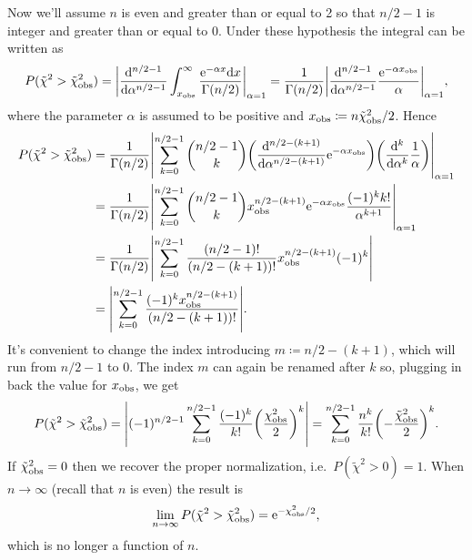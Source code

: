 Now we'll assume $n$ is even and greater than or equal to \num{2} so that $n/2-1$ is integer and greater than or equal to \num{0}.
Under these hypothesis the integral can be written as
\begin{equation*}
	P(\tilde\chi^2>\tilde\chi^2_\textup{obs})  =
	\abs*{\deriv[n/2-1]{}{\alpha}\int_{x_\textup{obs}}^\infty\frac{\eu^{-\alpha x} \!\ud x}{\Gamma(n/2)}}_{\alpha=1}
	= \frac{1}{\Gamma(n/2)}\abs*{\deriv[n/2-1]{}{\alpha}\frac{\eu^{-\alpha x_\textup{obs}}}{\alpha}}_{\alpha=1},
\end{equation*}
where the parameter $\alpha$ is assumed to be positive and $x_\textup{obs} \coloneqq n\tilde \chi^2_\textup{obs}/2$.
Hence
\begin{equation*}
	\begin{aligned}
		P(\tilde\chi^2>\tilde\chi^2_\textup{obs})
		&= \frac{1}{\Gamma(n/2)}
		\abs*{\sum_{k=0}^{n/2-1}{n/2-1 \choose k}
			\roundBrackets*{\deriv[n/2-(k+1)]{}{\alpha}\eu^{-\alpha x_\textup{obs}}}
			\roundBrackets*{\deriv[k]{}{\alpha}\frac{1}{\alpha}}
		}_{\alpha=1}\\
		&= \frac{1}{\Gamma(n/2)}
		\abs*{\sum_{k=0}^{n/2-1}{n/2-1 \choose k}
			x_\textup{obs}^{n/2-(k+1)}\eu^{-\alpha x_\textup{obs}}
			\frac{(-1)^kk!}{\alpha^{k+1}}
		}_{\alpha=1}\\
		&= \frac{1}{\Gamma(n/2)}
		\abs*{\sum_{k=0}^{n/2-1}\frac{(n/2-1)!}{ (n/2 - (k+1))!}
			x_\textup{obs}^{n/2-(k+1)}
			(-1)^k
		}\\
		&=
		\abs*{
			\sum_{k=0}^{n/2-1}\frac{(-1)^kx_\textup{obs}^{n/2-(k+1)}}{(n/2 - (k+1))!}
		}.
	\end{aligned}
\end{equation*}
It's convenient to change the index introducing $m\coloneqq n/2-(k+1)$, which will run from $n/2-1$ to $0$.
The index $m$ can again be renamed after $k$ so, plugging in back the value for $x_\textup{obs}$, we get
\begin{equation}
	P(\tilde\chi^2>\tilde\chi^2_\textup{obs})
	=
	\abs*{(-1)^{n/2-1}
		\sum_{k=0}^{n/2-1}\frac{(-1)^k}{k!}
		\roundBrackets*{\frac{\chi^2_\textup{obs}}{2}}^{k}
	}
	=
	\sum_{k=0}^{n/2-1}\frac{n^k}{k!}
	\roundBrackets*{-\frac{\tilde \chi^2_\textup{obs}}{2}}^{k}.
\end{equation}
If $\tilde\chi^2_\textup{obs} = 0$ then we recover the proper normalization, i.e.~$P(\tilde\chi^2 > 0) = 1$.
When $n\to\infty$ (recall that $n$ is even) the result is
\begin{equation}
	\lim_{n\to\infty}P(\tilde\chi^2>\tilde\chi^2_\textup{obs}) = \mathrm{e}^{-\chi^2_\textup{obs}/2},
\end{equation}
which is no longer a function of $n$.


